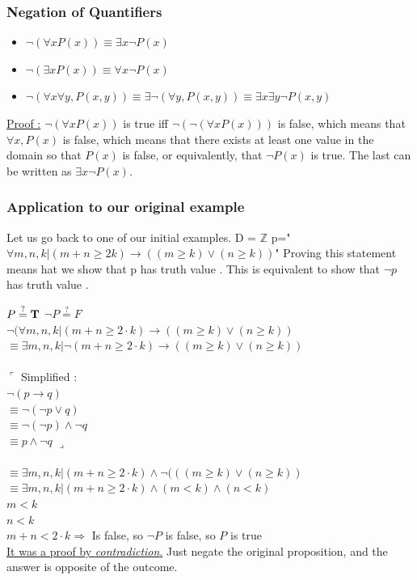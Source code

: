 \documentclass[12pt,a4paper]{article}
\begin{document}
\subsubsection{Negation of Quantifiers}
\begin{itemize}
	\item $\neg (\forall x P(x)) \equiv \exists x \neg P(x)$
	\item $\neg (\exists x P(x)) \equiv \forall x \neg P(x)$
	\item $\neg (\forall x \forall y, P(x,y)) \equiv \exists \neg (\forall y, P(x,y)) \equiv \exists x \exists y \neg P(x,y)$
\end{itemize}

\underline{Proof :} $\neg (\forall x P(x))$ is true iff $\neg (\neg (\forall x P(x)))$ is false, which means that $\forall x, P(x)$ is false, which means that there exists at least one value in the domain so that $P(x)$ is false, or equivalently, that $\neg P(x)$ is true. The last can be written as $\exists x \neg P(x)$.

\subsubsection{Application to our original example}
Let us go back to one of our initial examples. D = $\pmb{\mathbb{{Z}}}$
p="$\forall m,n,k|(m+n \geq 2k)  \rightarrow ((m \geq k) \vee (n \geq k))$"
Proving this statement means hat we show that p has truth value . This is equivalent to show that $\neg p$ has truth value . 

$P \overset{?}{=} \textbf{T}$  $\neg P \overset{?}{=} F$\\
$\neg (\forall m, n, k | (m+n \geq 2\cdot k) \rightarrow ((m \geq k) \vee (n \geq k))$ \\$\equiv \exists m, n, k | \neg (m+n \geq 2\cdot k) \rightarrow ((m \geq k) \vee (n \geq k))$ \\
\\
$\ulcorner$ Simplified :
\\$ \neg (p \rightarrow q)$\\
$\equiv \neg (\neg  p \vee q)$\\
$\equiv \neg (\neg p) \wedge \neg q$\\
$\equiv p \wedge \neg q $  $\lrcorner$\\
\\
$\equiv \exists m, n, k| (m+n \geq 2\cdot k) \wedge \neg (((m \geq k) \vee (n \geq k))$\\
$\equiv \exists m, n, k| (m+n \geq 2\cdot k) \wedge (m < k) \wedge (n < k)$\\
$m < k$\\
$n < k$\\
$m+n < 2\cdot k \Rightarrow$ Is false, so $\neg P$ is false, so $P$ is true\\
\underline{It was a proof by \textit{contradiction}.} Just negate the original proposition, and the answer is opposite of the outcome.
\end{document}
